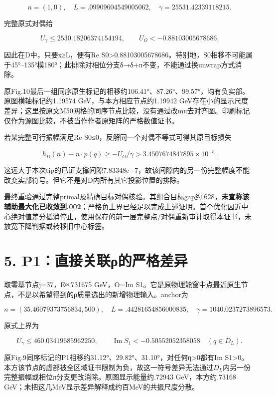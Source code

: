 \documentclass[
  10pt,
  a4paper,
]{article}
\begin{document}
\[n=(1,0),\quad L=.09909604549005062,
\quad\gamma=25531.42339118215.\]

完整原式对偶给

\[U_\gamma\le2530.18206374154194,\qquad
\boxed{U_O<-0.88103005678686.}\]

因此在D中，只要x≥L，便有Re
S0\textgreater0.88103005678686。特别地，S0相移不可能属于45°--135°模180°；此排除对相位分支δ→δ+π不变，不能通过换unwrap方式消除。

原Fig.10最后一组同序原生标记的相移约106.41°、87.26°、99.57°，均有负实部。原图横轴标记约1.19574
GeV，与本方相应节点约1.19942
GeV存在小的显示尺度差异；这里按原文M50网格的同序节点比较，没有通过改mπ去对齐图。印刷标记仅作为源图比较，不被当作作者原矩阵的严格数值证书。

若某完整可行振幅满足Re S0≤0，反解同一个对偶不等式可得其原目标损失

\[h_D(n)-n\cdot p(q)\ge -U_O/\gamma
>3.4507674847895\times10^{-5}.\]

这远大于本次tip的已证支撑间隙7.83348e−7，故该间隙内的另一份完整幅度不能改变实部符号。但它不是对D内所有其它投影位置的排除。

\href{../tip_S0_certificate_final/probe.json}{最终重验}通过完整primal及精确目标对偶核验。其组合目标gap约.628，\textbf{未宣称该辅助最大化已收敛到.002}；严格负上界已经足以完成上述证明。首个优化因近中心绝对值差分抵消停止，使用保存的前一层完整点/对偶重新审计取得本证书，未放宽下降判据或转移旧中心标签。

\section{5.
P1：直接关联ρ的严格差异}\label{p1ux76f4ux63a5ux5173ux8054ux3c1ux7684ux4e25ux683cux5deeux5f02}

取零基节点j=37，E≈.731675 GeV，O=Im
S1。它是原物理能窗中点最近原生节点，不是以希望得到的ρ质量选出的新增物理输入。anchor为

\[n=(35.46079373756834,500),\quad
L=.44281654856000835,\quad\gamma=1040.0237273896573.\]

原式上界为

\[U_\gamma\le460.03419685962250,\qquad
\boxed{\operatorname{Im}S_1<-0.50552052358058\quad(q\in D_L).}\]

原Fig.9同序标记的P1相移约31.12°、29.82°、31.10°，对任何η\textgreater0都有Im
S1\textgreater0。本方该节点的虚部被全区域证书限制为负，故这一符号差异无法通过\(D_L\)内另一份完整振幅或相位π分支更改消除。原图显示能量约.72943
GeV，本方约.73168 GeV；未把这几MeV显示差异解释成约百MeV的共振尺度分散。
\end{document}
